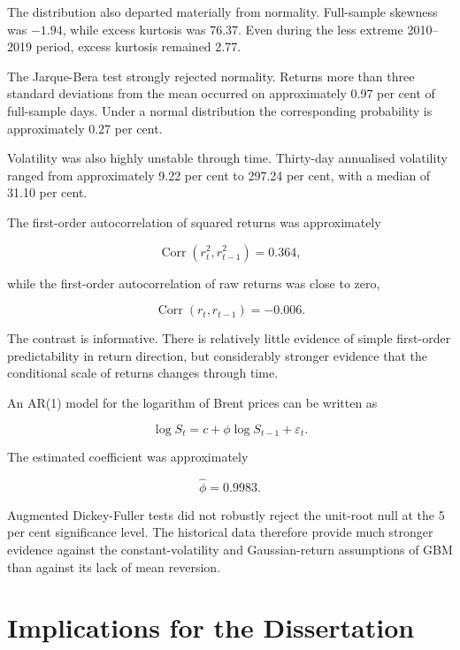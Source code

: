 The distribution also departed materially from normality. Full-sample skewness was $-1.94$, while excess kurtosis was 76.37. Even during the less extreme 2010--2019 period, excess kurtosis remained 2.77.

The Jarque-Bera test strongly rejected normality. Returns more than three standard deviations from the mean occurred on approximately 0.97 per cent of full-sample days. Under a normal distribution the corresponding probability is approximately 0.27 per cent.

Volatility was also highly unstable through time. Thirty-day annualised volatility ranged from approximately 9.22 per cent to 297.24 per cent, with a median of 31.10 per cent.

The first-order autocorrelation of squared returns was approximately

\begin{equation}
\operatorname{Corr}
(r_t^2,r_{t-1}^2)
=
0.364,
\end{equation}

while the first-order autocorrelation of raw returns was close to zero,

\begin{equation}
\operatorname{Corr}
(r_t,r_{t-1})
=
-0.006.
\end{equation}

The contrast is informative. There is relatively little evidence of simple first-order predictability in return direction, but considerably stronger evidence that the conditional scale of returns changes through time.

An AR(1) model for the logarithm of Brent prices can be written as

\begin{equation}
\log S_t
=
c
+
\phi \log S_{t-1}
+
\varepsilon_t.
\end{equation}

The estimated coefficient was approximately

\begin{equation}
\widehat{\phi}
=
0.9983.
\end{equation}

Augmented Dickey-Fuller tests did not robustly reject the unit-root null at the 5 per cent significance level. The historical data therefore provide much stronger evidence against the constant-volatility and Gaussian-return assumptions of GBM than against its lack of mean reversion.

\section{Implications for the Dissertation}

